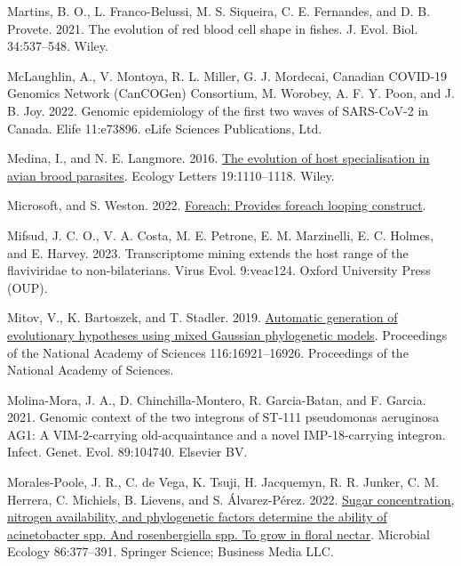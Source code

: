 \documentclass[fleqn,10pt,lineno]{wlpeerj} %
\newlength{\cslhangindent}
\newlength{\cslentryspacingunit} %
\newenvironment{CSLReferences}[2] %
 {%
  \setlength{\parindent}{0pt}
  \ifodd #1
  \let\oldpar\par
  \def\par{\hangindent=\cslhangindent\oldpar}
  \fi
  \setlength{\parskip}{#2\cslentryspacingunit}
 }%
 {}
\begin{document}
\begin{CSLReferences}{1}{0}
\leavevmode{}%
Martins, B. O., L. Franco-Belussi, M. S. Siqueira, C. E. Fernandes, and D. B. Provete. 2021. The evolution of red blood cell shape in fishes. J. Evol. Biol. 34:537--548. Wiley.

\leavevmode{}%
McLaughlin, A., V. Montoya, R. L. Miller, G. J. Mordecai, Canadian COVID-19 Genomics Network (CanCOGen) Consortium, M. Worobey, A. F. Y. Poon, and J. B. Joy. 2022. Genomic epidemiology of the first two waves of {SARS-CoV-2} in {C}anada. Elife 11:e73896. eLife Sciences Publications, Ltd.

\leavevmode{}%
Medina, I., and N. E. Langmore. 2016. \href{https://doi.org/10.1111/ele.12649}{The evolution of host specialisation in avian brood parasites}. Ecology Letters 19:1110--1118. Wiley.

\leavevmode{}%
Microsoft, and S. Weston. 2022. \href{https://CRAN.R-project.org/package=foreach}{Foreach: Provides foreach looping construct}.

\leavevmode{}%
Mifsud, J. C. O., V. A. Costa, M. E. Petrone, E. M. Marzinelli, E. C. Holmes, and E. Harvey. 2023. Transcriptome mining extends the host range of the flaviviridae to non-bilaterians. Virus Evol. 9:veac124. Oxford University Press (OUP).

\leavevmode{}%
Mitov, V., K. Bartoszek, and T. Stadler. 2019. \href{https://doi.org/10.1073/pnas.1813823116}{Automatic generation of evolutionary hypotheses using mixed {G}aussian phylogenetic models}. Proceedings of the National Academy of Sciences 116:16921--16926. Proceedings of the National Academy of Sciences.

\leavevmode{}%
Molina-Mora, J. A., D. Chinchilla-Montero, R. Garcia-Batan, and F. Garcia. 2021. Genomic context of the two integrons of {ST-111} pseudomonas aeruginosa {AG1}: A {VIM-2-carrying} old-acquaintance and a novel {IMP-18-carrying} integron. Infect. Genet. Evol. 89:104740. Elsevier BV.

\leavevmode{}%
Morales-Poole, J. R., C. de Vega, K. Tsuji, H. Jacquemyn, R. R. Junker, C. M. Herrera, C. Michiels, B. Lievens, and S. Álvarez-Pérez. 2022. \href{https://doi.org/10.1007/s00248-022-02088-4}{Sugar concentration, nitrogen availability, and phylogenetic factors determine the ability of acinetobacter spp. And rosenbergiella spp. To grow in floral nectar}. Microbial Ecology 86:377--391. Springer Science; Business Media {LLC}.


\end{CSLReferences}
\end{document}
